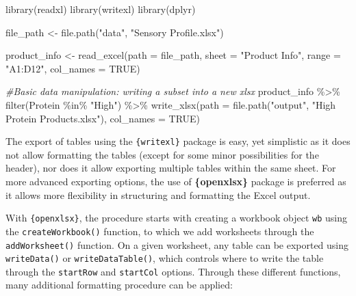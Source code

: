 \documentclass[
]{book}
\newenvironment{Shaded}{\begin{snugshade}}{\end{snugshade}}
\newcommand{\AttributeTok}[1]{\textcolor[rgb]{0.77,0.63,0.00}{#1}}
\newcommand{\CommentTok}[1]{\textcolor[rgb]{0.56,0.35,0.01}{\textit{#1}}}
\newcommand{\ConstantTok}[1]{\textcolor[rgb]{0.00,0.00,0.00}{#1}}
\newcommand{\FunctionTok}[1]{\textcolor[rgb]{0.00,0.00,0.00}{#1}}
\newcommand{\NormalTok}[1]{#1}
\newcommand{\OtherTok}[1]{\textcolor[rgb]{0.56,0.35,0.01}{#1}}
\newcommand{\SpecialCharTok}[1]{\textcolor[rgb]{0.00,0.00,0.00}{#1}}
\newcommand{\StringTok}[1]{\textcolor[rgb]{0.31,0.60,0.02}{#1}}
\begin{document}
\begin{Shaded}
\begin{Highlighting}[]
\FunctionTok{library}\NormalTok{(readxl)}
\FunctionTok{library}\NormalTok{(writexl)}
\FunctionTok{library}\NormalTok{(dplyr)}

\NormalTok{file\_path }\OtherTok{\textless{}{-}} \FunctionTok{file.path}\NormalTok{(}\StringTok{"data"}\NormalTok{, }\StringTok{"Sensory Profile.xlsx"}\NormalTok{)}

\NormalTok{product\_info }\OtherTok{\textless{}{-}} \FunctionTok{read\_excel}\NormalTok{(}\AttributeTok{path  =}\NormalTok{ file\_path,}
                           \AttributeTok{sheet =} \StringTok{"Product Info"}\NormalTok{,}
                           \AttributeTok{range =} \StringTok{"A1:D12"}\NormalTok{,}
                           \AttributeTok{col\_names =} \ConstantTok{TRUE}\NormalTok{)}

\CommentTok{\#Basic data manipulation: writing a subset into a new xlsx}
\NormalTok{product\_info }\SpecialCharTok{\%\textgreater{}\%} 
  \FunctionTok{filter}\NormalTok{(Protein }\SpecialCharTok{\%in\%} \StringTok{"High"}\NormalTok{) }\SpecialCharTok{\%\textgreater{}\%} 
  \FunctionTok{write\_xlsx}\NormalTok{(}\AttributeTok{path =} \FunctionTok{file.path}\NormalTok{(}\StringTok{"output"}\NormalTok{, }\StringTok{"High Protein Products.xlsx"}\NormalTok{),}
             \AttributeTok{col\_names =} \ConstantTok{TRUE}\NormalTok{)}
\end{Highlighting}
\end{Shaded}

The export of tables using the \texttt{\{writexl\}} package is easy, yet simplistic as it does not allow formatting the tables (except for some minor possibilities for the header), nor does it allow exporting multiple tables within the same sheet. For more advanced exporting options, the use of \textbf{\{openxlsx\}} package is preferred as it allows more flexibility in structuring and formatting the Excel output.

With \texttt{\{openxlsx\}}, the procedure starts with creating a workbook object \texttt{wb} using the \texttt{createWorkbook()} function, to which we add worksheets through the \texttt{addWorksheet()} function.
On a given worksheet, any table can be exported using \texttt{writeData()} or \texttt{writeDataTable()}, which controls where to write the table through the \texttt{startRow} and \texttt{startCol} options.
Through these different functions, many additional formatting procedure can be applied:
\end{document}
